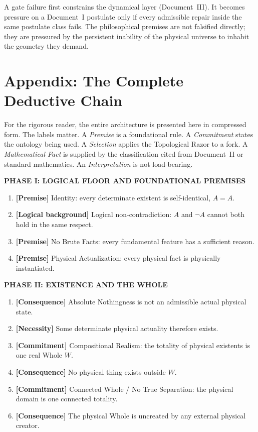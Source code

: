 \documentclass[11pt]{article}
\theoremstyle{canonstyle}
\begin{document}
\begin{plainwords}
A gate failure first constrains the dynamical layer (Document~III). It becomes pressure on a Document~I postulate only if every admissible repair inside the same postulate class fails. The philosophical premises are not falsified directly; they are pressured by the persistent inability of the physical universe to inhabit the geometry they demand.
\end{plainwords}

\newpage
\section*{Appendix: The Complete Deductive Chain}
{}

For the rigorous reader, the entire architecture is presented here in compressed form. The labels matter. A \emph{Premise} is a foundational rule. A \emph{Commitment} states the ontology being used. A \emph{Selection} applies the Topological Razor to a fork. A \emph{Mathematical Fact} is supplied by the classification cited from Document~II or standard mathematics. An \emph{Interpretation} is not load-bearing.

\textbf{PHASE I: LOGICAL FLOOR AND FOUNDATIONAL PREMISES}
\begin{enumerate}
    \item \textbf{[Premise]} Identity: every determinate existent is self-identical, $A=A$.
    \item \textbf{[Logical background]} Logical non-contradiction: $A$ and $\neg A$ cannot both hold in the same respect.
    \item \textbf{[Premise]} No Brute Facts: every fundamental feature has a sufficient reason.
    \item \textbf{[Premise]} Physical Actualization: every physical fact is physically instantiated.
\end{enumerate}

\textbf{PHASE II: EXISTENCE AND THE WHOLE}
\begin{enumerate}[resume]
    \item \textbf{[Consequence]} Absolute Nothingness is not an admissible actual physical state.
    \item \textbf{[Necessity]} Some determinate physical actuality therefore exists.
    \item \textbf{[Commitment]} Compositional Realism: the totality of physical existents is one real Whole $W$.
    \item \textbf{[Consequence]} No physical thing exists outside $W$.
    \item \textbf{[Commitment]} Connected Whole / No True Separation: the physical domain is one connected totality.
    \item \textbf{[Consequence]} The physical Whole is uncreated by any external physical creator.
\end{enumerate}
\end{document}
